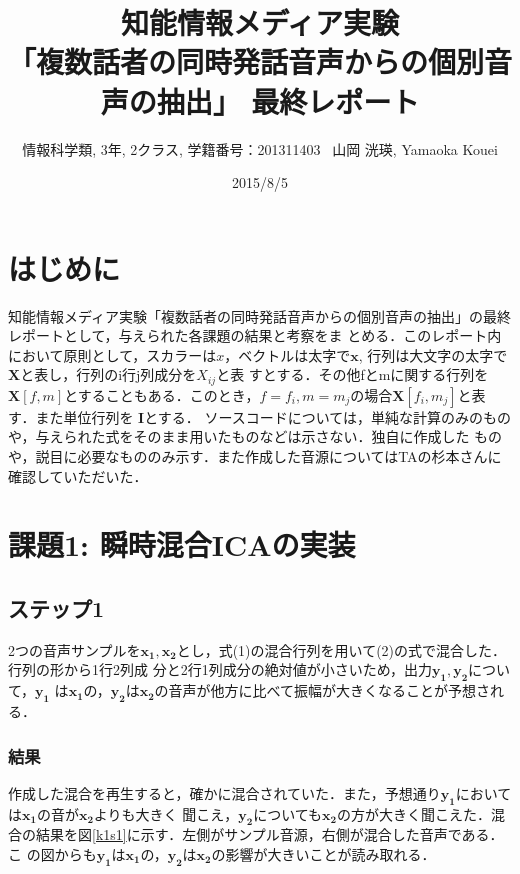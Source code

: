 \documentclass[a4j]{jarticle}
\title{知能情報メディア実験\\ 「複数話者の同時発話音声からの個別音声の抽出」
最終レポート}
\author{情報科学類, 3年, 2クラス, 学籍番号：201311403 \ 山岡 洸瑛, Yamaoka
Kouei}
\date{2015/8/5}
\begin{document}
\begin{titlepage}
\maketitle 
\thispagestyle{empty}
\end{titlepage}
\setcounter{tocdepth}{2}
\tableofcontents
\newpage

\section{はじめに}
知能情報メディア実験「複数話者の同時発話音声からの個別音声の抽出」の最終レポートとして，与えられた各課題の結果と考察をま
とめる．このレポート内において原則として，スカラーは$x$，ベクトルは太字で$\bm{x}$, 行列は大文字の太字で$\bm{X}$と表し，行列のi行j列成分を$X_{ij}$と表
すとする．その他fとmに関する行列を$\bm{X}[f,m]$とすることもある．このとき，$f=f_i, m=m_j$の場合$\bm{X}[f_i, m_j]$と表す．また単位行列を
$\bm{I}$とする．
ソースコードについては，単純な計算のみのものや，与えられた式をそのまま用いたものなどは示さない．独自に作成した
ものや，説目に必要なもののみ示す．また作成した音源についてはTAの杉本さんに確認していただいた．
\section{課題1: 瞬時混合ICAの実装}
\subsection{ステップ1}
2つの音声サンプルを$\bm{x_1}, \bm{x_2}$とし，式(1)の混合行列を用いて(2)の式で混合した．行列の形から1行2列成
分と2行1列成分の絶対値が小さいため，出力$\bm{y_1}, \bm{y_2}$について，$\bm{y_1}$
は$\bm{x_1}$の，$\bm{y_2}$は$\bm{x_2}$の音声が他方に比べて振幅が大きくなることが予想される．
\subsubsection{結果}
作成した混合を再生すると，確かに混合されていた．また，予想通り$\bm{y_1}$においては$\bm{x_1}$の音が$\bm{x_2}$よりも大きく
聞こえ，$\bm{y_2}$についても$\bm{x_2}$の方が大きく聞こえた．混合の結果を図\ref{k1s1}に示す．左側がサンプル音源，右側が混合した音声である．こ
の図からも$\bm{y_1}$は$\bm{x_1}$の，$\bm{y_2}$は$\bm{x_2}$の影響が大きいことが読み取れる．
\end{document}
